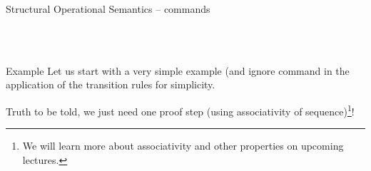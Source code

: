 \documentclass[aspectratio=169]{beamer}
\begin{document}
\begin{slide}{Structural Operational Semantics -- commands}
\small 
\centering
\newcommand{\msep}{~~~~~~}

%
  {\alert{\Longrightarrow {}}}%
  { \Longrightarrow {}}
\msep %
%
  {}%
  { \Longrightarrow {}}
\msep %
%
  {\Longrightarrow {}}%
  { \Longrightarrow {}}
\msep
{}%
  {}%
  { \Longrightarrow {}}
\\[5mm] %
%
  {\alert{\leadsto {}}}%
  { \Longrightarrow {}}
\msep %
%
  {\alert{\leadsto {}}}%
  { \Longrightarrow {}}
\\[5mm] %
%
  {}
  { \Longrightarrow {}}
\end{slide}




\begin{slide}{Example}
Let us start with a very simple example (and ignore  command in the application of the transition rules for simplicity.
\begin{prooftree}
\end{prooftree}
Truth to be told, we just need one proof step (using associativity of sequence)\footnote{We will learn more about associativity and other properties on upcoming lectures.}!
\begin{prooftree}
\end{prooftree}
\end{slide}
\end{document}
